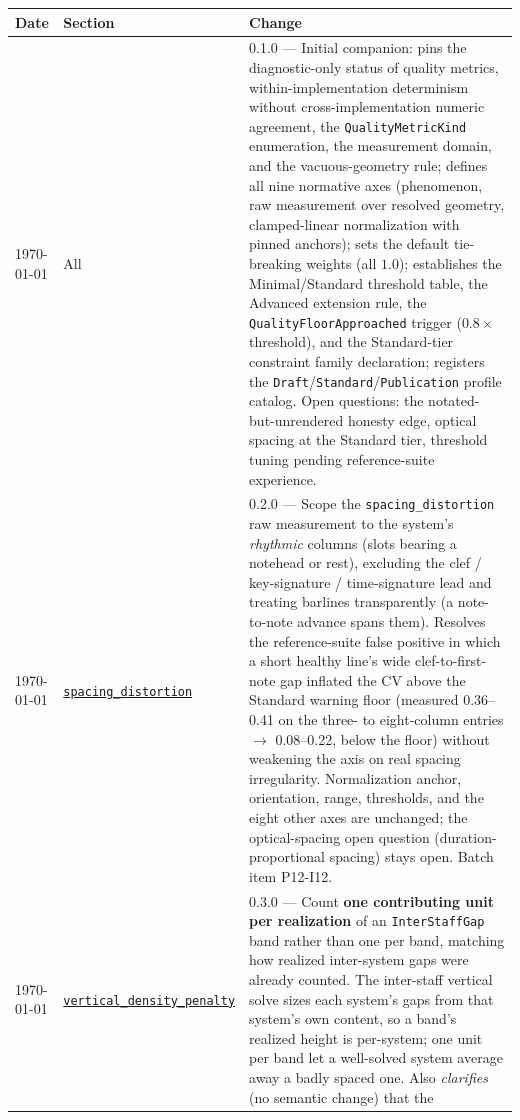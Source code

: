 \documentclass[11pt,letterpaper]{report}
\begin{document}
\begin{longtable}{p{2cm} p{2.5cm} p{9cm}}
  \toprule
  \textbf{Date} & \textbf{Section} & \textbf{Change} \\
  \midrule
  \endhead
  \today & All & 0.1.0 --- Initial companion: pins the diagnostic-only
  status of quality metrics, within-implementation determinism without
  cross-implementation numeric agreement, the \texttt{QualityMetricKind}
  enumeration, the measurement domain, and the vacuous-geometry rule;
  defines all nine normative axes (phenomenon, raw measurement over
  resolved geometry, clamped-linear normalization with pinned anchors);
  sets the default tie-breaking weights (all $1.0$); establishes the
  Minimal/Standard threshold table, the Advanced extension rule, the
  \texttt{QualityFloorApproached} trigger ($0.8\times$ threshold), and
  the Standard-tier constraint family declaration; registers the
  \texttt{Draft}/\texttt{Standard}/\texttt{Publication} profile catalog.
  Open questions: the notated-but-unrendered honesty edge, optical
  spacing at the Standard tier, threshold tuning pending reference-suite
  experience. \\
  \today & \hyperref[sec:metrics:spacing]{\texttt{spacing\_distortion}}
  & 0.2.0 --- Scope the \texttt{spacing\_distortion} raw measurement to the
  system's \emph{rhythmic} columns (slots bearing a notehead or rest),
  excluding the clef / key-signature / time-signature lead and treating
  barlines transparently (a note-to-note advance spans them). Resolves the
  reference-suite false positive in which a short healthy line's wide
  clef-to-first-note gap inflated the CV above the Standard warning floor
  (measured 0.36--0.41 on the three- to eight-column entries $\to$
  0.08--0.22, below the floor) without weakening the axis on real spacing
  irregularity. Normalization anchor, orientation, range, thresholds, and
  the eight other axes are unchanged; the optical-spacing open question
  (duration-proportional spacing) stays open. Batch item P12-I12. \\
  \midrule
  \today & \hyperref[sec:metrics:vertical]{\texttt{vertical\_density\_penalty}}
  & 0.3.0 --- Count \textbf{one contributing unit per realization} of an
  \texttt{InterStaffGap} band rather than one per band, matching how realized
  inter-system gaps were already counted. The inter-staff vertical solve sizes
  each system's gaps from that system's own content, so a band's realized
  height is per-system; one unit per band let a well-solved system average away
  a badly spaced one. Also \emph{clarifies} (no semantic change) that the

\end{longtable}
\end{document}

